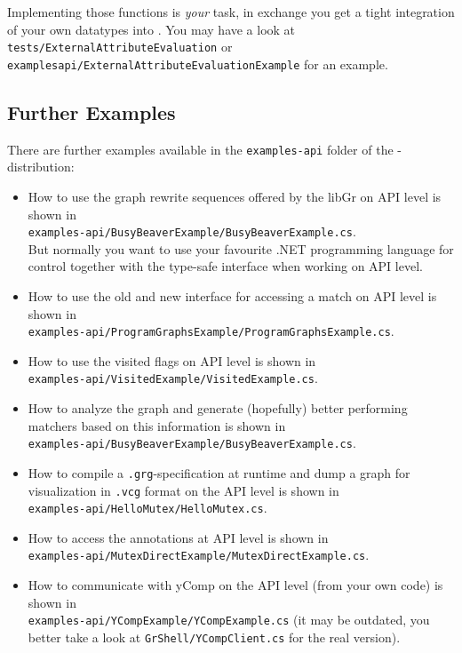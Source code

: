 Implementing those functions is \emph{your} task, in exchange you get a tight integration of your own datatypes into \GrG.
You may have a look at \texttt{tests/ExternalAttributeEvaluation} or  \texttt{examples\-api/ExternalAttributeEvaluationExample} for an example.

\subsection*{Further Examples}
There are further examples available in the \texttt{examples-api} folder of the \GrG-distribution:
\begin{itemize} 
\item How to use the graph rewrite sequences offered by the libGr on API level is shown in\\
\texttt{examples-api/BusyBeaverExample/BusyBeaverExample.cs}.\\
But normally you want to use your favourite .NET programming language for control together with the type-safe interface when working on API level.
\item How to use the old and new interface for accessing a match on API level is shown in\\
\texttt{examples-api/ProgramGraphsExample/ProgramGraphsExample.cs}.
\item How to use the visited\label{apiallocvisitflag} flags on API level is shown in\\
\texttt{examples-api/VisitedExample/VisitedExample.cs}.
\item How to analyze the graph and generate (hopefully) better performing matchers based on this information is shown in\\
\texttt{examples-api/BusyBeaverExample/BusyBeaverExample.cs}.
\item How to compile a \texttt{.grg}-specification at runtime and dump a graph for visualization in \texttt{.vcg} format on the API level is shown in\\
\texttt{examples-api/HelloMutex/HelloMutex.cs}.
\item How to access the annotations at API level is shown in\\
\texttt{examples-api/MutexDirectExample/MutexDirectExample.cs}.
\item How to communicate with yComp on the API level (from your own code) is shown in\\
\texttt{examples-api/YCompExample/YCompExample.cs} (it may be outdated, you better take a look at \texttt{GrShell/YCompClient.cs} for the real version).
\end{itemize}

